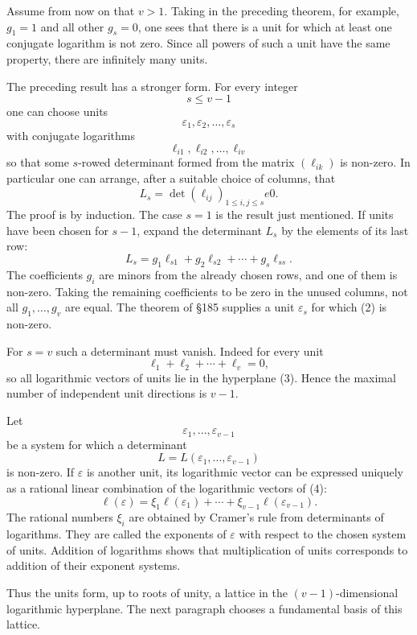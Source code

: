 \documentclass[11pt,a4paper]{book}
\begin{document}
Assume from now on that \(v>1\).  Taking in the preceding theorem, for example, \(g_1=1\) and all other \(g_s=0\), one sees that there is a unit for which at least one conjugate logarithm is not zero.  Since all powers of such a unit have the same property, there are infinitely many units.

The preceding result has a stronger form.  For every integer
\[
  s\le v-1
\]
one can choose units
\[
  \varepsilon_1,\varepsilon_2,
\ldots,\varepsilon_s
\]
with conjugate logarithms
\[
  \ell_{i1},\ell_{i2},\ldots,
\ell_{iv}
\]
so that some \(s\)-rowed determinant formed from the matrix \((\ell_{ik})\) is non-zero.  In particular one can arrange, after a suitable choice of columns, that
\[
  L_s=\det(\ell_{ij})_{1\le i,j\le s}
e0.
\tag{1}
\]
The proof is by induction.  The case \(s=1\) is the result just mentioned.  If units have been chosen for \(s-1\), expand the determinant \(L_s\) by the elements of its last row:
\[
  L_s=g_1\ell_{s1}+g_2\ell_{s2}+\cdots+g_s\ell_{ss}.
\tag{2}
\]
The coefficients \(g_i\) are minors from the already chosen rows, and one of them is non-zero.  Taking the remaining coefficients to be zero in the unused columns, not all \(g_1,
\ldots,g_v\) are equal.  The theorem of \S185 supplies a unit \(\varepsilon_s\) for which (2) is non-zero.

For \(s=v\) such a determinant must vanish.  Indeed for every unit
\[
  \ell_1+\ell_2+\cdots+\ell_v=0,
\tag{3}
\]
so all logarithmic vectors of units lie in the hyperplane (3).  Hence the maximal number of independent unit directions is \(v-1\).

Let
\[
  \varepsilon_1,
\ldots,
\varepsilon_{v-1}
\tag{4}
\]
be a system for which a determinant
\[
  L=L(\varepsilon_1,
\ldots,
\varepsilon_{v-1})
\tag{5}
\]
is non-zero.  If \(\varepsilon\) is another unit, its logarithmic vector can be expressed uniquely as a rational linear combination of the logarithmic vectors of (4):
\[
  \ell(\varepsilon)=\xi_1\ell(\varepsilon_1)+\cdots+\xi_{v-1}\ell(\varepsilon_{v-1}).
\tag{6}
\]
The rational numbers \(\xi_i\) are obtained by Cramer's rule from determinants of logarithms.  They are called the exponents of \(\varepsilon\) with respect to the chosen system of units.  Addition of logarithms shows that multiplication of units corresponds to addition of their exponent systems.

Thus the units form, up to roots of unity, a lattice in the \((v-1)\)-dimensional logarithmic hyperplane.  The next paragraph chooses a fundamental basis of this lattice.
\end{document}

